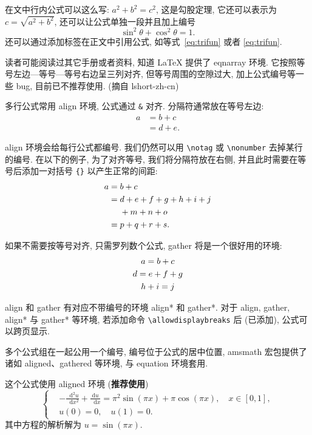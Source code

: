 \documentclass[zihao=-4]{ctexart}
\numberwithin{equation}{section}
\numberwithin{figure}{section}
\numberwithin{table}{section}
\theoremstyle{plain}
\newcommand{\dif}{\mathop{}\!\mathrm{d}}
\begin{document}
在文中行内公式可以这么写: $a^2+b^2=c^2$, 这是勾股定理, 它还可以表示为 $c=\sqrt{a^2+b^2}$, 还可以让公式单独一段并且加上编号
\begin{equation}\label{eq:trifun}
\sin^2{\theta}+\cos^2{\theta}=1.
\end{equation}
还可以通过添加标签在正文中引用公式, 如等式~\eqref{eq:trifun} 或者 \ref{eq:trifun}.

读者可能阅读过其它手册或者资料, 知道 LaTeX 提供了 eqnarray 环境. 它按照等号左边—等号—等号右边呈三列对齐, 但等号周围的空隙过大, 加上公式编号等一些 bug, 目前已不推荐使用. (摘自 lshort-zh-cn)

多行公式常用 align 环境, 公式通过 \verb|&| 对齐. 分隔符通常放在等号左边:
\begin{align}
a & = b + c \\
& = d + e.
\end{align}

align 环境会给每行公式都编号. 我们仍然可以用 \verb|\notag| 或 \verb|\nonumber| 去掉某行的编号. 在以下的例子,
为了对齐等号, 我们将分隔符放在右侧, 并且此时需要在等号后添加一对括号 \verb|{}| 以产生正常的间距:
\begin{align}
a ={} & b + c \\
={} & d + e + f + g + h + i + j \notag \\
& + m + n + o \\
={} & p + q + r + s.
\end{align}

如果不需要按等号对齐, 只需罗列数个公式, gather 将是一个很好用的环境:
\begin{gather}
a = b + c \\
d = e + f + g \notag \\
h + i = j
\end{gather}

align 和 gather 有对应不带编号的环境 align* 和 gather*.
对于 align, gather, align* 与 gather* 等环境, 若添加命令 \verb|\allowdisplaybreaks| 后 (已添加), 公式可以跨页显示.

多个公式组在一起公用一个编号, 编号位于公式的居中位置, amsmath 宏包提供了诸如 aligned、gathered 等环境, 与 equation 环境套用.

这个公式使用 aligned 环境 (\textbf{推荐使用})
\begin{equation}\label{eq:alignedEq}
\left\{\begin{aligned}
  &-\frac{{\dif}^{2} u}{\dif x^{2}}+\frac{\mathrm{d} u}{\dif x}=\pi^{2} \sin (\pi x)+\pi \cos (\pi x),\quad x \in [0,1], \\
  &u(0)=0,\quad u(1)=0.
\end{aligned} \right.
\end{equation}
其中方程的解析解为 $u=\sin(\pi x)$.
\end{document}
